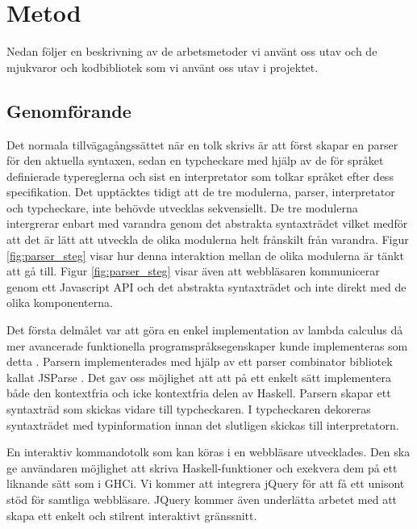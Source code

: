 \section{Metod} 

Nedan följer en beskrivning av de arbetsmetoder vi använt oss utav och de mjukvaror och kodbibliotek som vi använt oss utav i projektet. 

\subsection{Genomförande}

Det normala tillvägagångssättet när en tolk skrivs är att först
skapar en parser för den aktuella syntaxen, sedan en typcheckare med 
hjälp av de för språket definierade typereglerna och sist en interpretator
som tolkar språket efter dess specifikation. 
Det upptäcktes tidigt att de tre modulerna, parser, interpretator och typcheckare, inte behövde utvecklas sekvensiellt. De tre modulerna intergrerar enbart med varandra genom det abstrakta syntaxträdet vilket medför att det är lätt att utveckla de olika modulerna helt frånskilt från varandra. Figur \ref{fig:parser_steg} visar hur denna interaktion mellan de olika modulerna är tänkt att gå till. Figur \ref{fig:parser_steg} visar även att webbläsaren kommunicerar genom ett Javascript API och det abstrakta syntaxträdet och inte direkt med de olika komponenterna. 

Det första delmålet var att göra en enkel implementation av lambda calculus då mer avancerade funktionella programspråksegenskaper kunde implementeras som detta \citep{jones87}.
Parsern implementerades med hjälp av ett parser combinator bibliotek kallat JSParse \citep{jsparse}. Det gav oss möjlighet att att på ett enkelt sätt implementera både den kontextfria och icke kontextfria delen av Haskell. Parsern skapar ett syntaxträd som skickas vidare till typcheckaren. I typcheckaren dekoreras syntaxträdet med typinformation innan det slutligen skickas till interpretatorn.

En interaktiv kommandotolk som kan köras i en webbläsare utvecklades. Den ska ge användaren möjlighet att skriva Haskell-funktioner och exekvera dem på ett liknande sätt som i GHCi. 
Vi kommer att integrera jQuery \citep{jquery} för att få ett unisont stöd för samtliga webbläsare. JQuery kommer även underlätta arbetet med att skapa ett enkelt och stilrent interaktivt gränssnitt.


